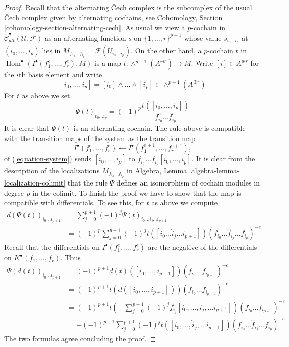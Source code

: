 \documentclass{stacks-project}
\theoremstyle{plain}
\theoremstyle{definition}
\theoremstyle{remark}
\numberwithin{equation}{subsection}
\def\Hom{\mathop{\mathrm{Hom}}\nolimits}
\begin{document}
\begin{proof}
Recall that the alternating {\v C}ech complex is the subcomplex
of the usual {\v C}ech complex given by alternating cochains, see
Cohomology, Section \ref{cohomology-section-alternating-cech}.
As usual we view a $p$-cochain in
$\check{\mathcal{C}}_{alt}^\bullet(\mathcal{U}, \mathcal{F})$
as an alternating function $s$ on $\{1, \ldots, r\}^{p + 1}$
whose value $s_{i_0\ldots i_p}$ at $(i_0, \ldots, i_p)$ lies in
$M_{f_{i_0}\ldots f_{i_p}} = \mathcal{F}(U_{i_0\ldots i_p})$.
On the other hand, a $p$-cochain $t$ in
$\Hom^\bullet(I^\bullet(f_1^e, \ldots, f_r^e), M)$
is a map $t : \wedge^{p + 1}(A^{\oplus r}) \to M$.
Write $[i] \in A^{\oplus r}$ for the $i$th basis element and
write
$$
[i_0, \ldots, i_p] = [i_0] \wedge \ldots \wedge [i_p]
\in \wedge^{p + 1}(A^{\oplus r})
$$
For $t$ as above we set
$$
\Psi(t)_{i_0 \ldots i_p} =
(-1)^p \frac{t([i_0, \ldots, i_p])}{f_{i_0}^e\ldots f_{i_p}^e}
$$
It is clear that $\Psi(t)$ is an alternating cochain.
The rule above is compatible with the transition maps
of the system as the transition map
$$
I^\bullet(f_1^e, \ldots, f_r^e) \leftarrow
I^\bullet(f_1^{e + 1}, \ldots, f_r^{e + 1}),
$$
of (\ref{equation-system}) sends $[i_0, \ldots, i_p]$
to $f_{i_0}\ldots f_{i_p}[i_0, \ldots, i_p]$.
It is clear from the description of the localizations
$M_{f_{i_0} \ldots f_{i_p}}$ in
Algebra, Lemma \ref{algebra-lemma-localization-colimit}
that the rule $\Psi$ defines an isomorphism of cochain modules
in degree $p$ in the colimit. To finish the proof we have to show that the map
is compatible with differentials. To see this, for $t$ as above we compute
\begin{align*}
d(\Psi(t))_{i_0 \ldots i_{p + 1}}
& =
\sum\nolimits_{j = 0}^{p + 1} (-1)^j
\Psi(t)_{i_0\ldots \hat i_j \ldots i_{p + 1}} \\
& =
(-1)^p
\sum\nolimits_{j = 0}^{p + 1} (-1)^j t([i_0 \ldots \hat i_j \ldots i_{p + 1}])
(f_{i_0} \ldots \hat f_{i_j} \ldots f_{i_p})^{-e}
\end{align*}
Recall that the differentials on $I^\bullet(f_1^e, \ldots, f_r^e)$
are the negative of the differentials on $K^\bullet(f_1, \ldots, f_r)$.
Thus
\begin{align*}
\Psi(d(t))_{i_0 \ldots i_{p + 1}} & =
(-1)^{p + 1}
d(t)([i_0, \ldots, i_{p + 1}]) (f_{i_0} \ldots f_{i_{p + 1}})^{-e} \\
& =
(-1)^{p + 1}
t(d([i_0, \ldots, i_{p + 1}])) (f_{i_0} \ldots f_{i_{p + 1}})^{-e} \\
& =
(-1)^{p + 1}
t(-\sum\nolimits_{j = 0}^{p + 1}
(-1)^j f_{i_j}^e [i_0, \ldots, \hat i_j, \ldots i_{p + 1}])
(f_{i_0} \ldots f_{i_{p + 1}})^{-e} \\
& =
-(-1)^{p + 1}
\sum\nolimits_{j = 0}^{p + 1}
(-1)^j t([i_0, \ldots, \hat i_j, \ldots i_{p + 1}])
(f_{i_0} \ldots \hat f_{i_j} \ldots f_{i_p})^{-e}
\end{align*}
The two formulas agree concluding the proof.
\end{proof}
\end{document}
